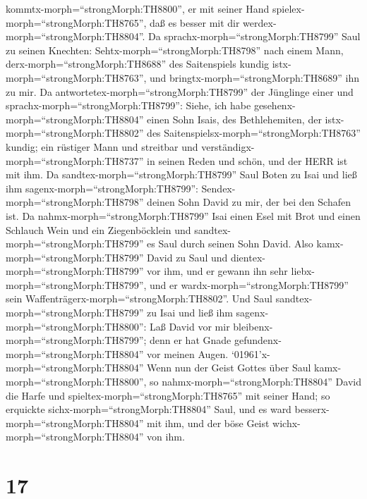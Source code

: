 kommtx-morph=``strongMorph:TH8800'', er mit seiner Hand
spielex-morph=``strongMorph:TH8765'', daß es besser mit dir
werdex-morph=``strongMorph:TH8804''.  Da
sprachx-morph=``strongMorph:TH8799'' Saul zu seinen Knechten:
Sehtx-morph=``strongMorph:TH8798'' nach einem Mann,
derx-morph=``strongMorph:TH8688'' des Saitenspiels kundig
istx-morph=``strongMorph:TH8763'', und
bringtx-morph=``strongMorph:TH8689'' ihn zu mir.  Da
antwortetex-morph=``strongMorph:TH8799'' der Jünglinge einer und
sprachx-morph=``strongMorph:TH8799'': Siehe, ich habe
gesehenx-morph=``strongMorph:TH8804'' einen Sohn Isais, des
Bethlehemiten, der istx-morph=``strongMorph:TH8802'' des
Saitenspielsx-morph=``strongMorph:TH8763'' kundig; ein rüstiger Mann und
streitbar und verständigx-morph=``strongMorph:TH8737'' in seinen Reden
und schön, und der HERR ist mit ihm.  Da
sandtex-morph=``strongMorph:TH8799'' Saul Boten zu Isai und ließ ihm
sagenx-morph=``strongMorph:TH8799'': Sendex-morph=``strongMorph:TH8798''
deinen Sohn David zu mir, der bei den Schafen ist.  Da
nahmx-morph=``strongMorph:TH8799'' Isai einen Esel mit Brot und einen
Schlauch Wein und ein Ziegenböcklein und
sandtex-morph=``strongMorph:TH8799'' es Saul durch seinen Sohn David.
 Also kamx-morph=``strongMorph:TH8799'' David zu Saul und
dientex-morph=``strongMorph:TH8799'' vor ihm, und er gewann ihn sehr
liebx-morph=``strongMorph:TH8799'', und er
wardx-morph=``strongMorph:TH8799'' sein
Waffenträgerx-morph=``strongMorph:TH8802''.  Und Saul
sandtex-morph=``strongMorph:TH8799'' zu Isai und ließ ihm
sagenx-morph=``strongMorph:TH8800'': Laß David vor mir
bleibenx-morph=``strongMorph:TH8799''; denn er hat Gnade
gefundenx-morph=``strongMorph:TH8804'' vor meinen Augen. 
`01961'\textbar x-morph=``strongMorph:TH8804'' Wenn nun der Geist Gottes
über Saul kamx-morph=``strongMorph:TH8800'', so
nahmx-morph=``strongMorph:TH8804'' David die Harfe und
spieltex-morph=``strongMorph:TH8765'' mit seiner Hand; so erquickte
sichx-morph=``strongMorph:TH8804'' Saul, und es ward
besserx-morph=``strongMorph:TH8804'' mit ihm, und der böse Geist
wichx-morph=``strongMorph:TH8804'' von ihm.

\hypertarget{section-16}{%
\section{17}\label{section-16}}

